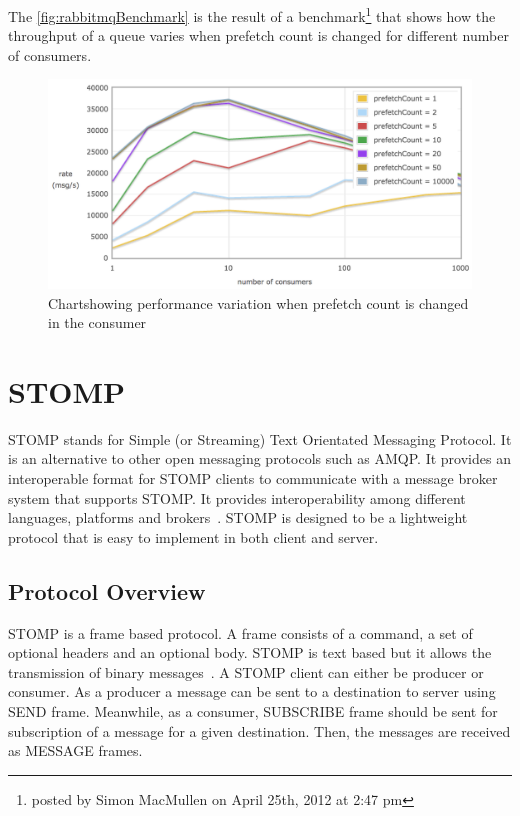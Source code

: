   The \autoref{fig:rabbitmqBenchmark} is the result of a benchmark\footnote{posted by Simon MacMullen on April 25th, 2012 at 2:47 pm} that shows how the throughput of a queue varies when prefetch count is changed for different number of consumers.
\begin{figure}[H]
  \centering
  \includegraphics[width=1\textwidth]{figures/rabbitmqPrefetch}
  \caption[Chart showing performance variation when prefetch count is changed in the consumer]{Chart\footnotemark showing performance variation when prefetch count is changed in the consumer}
  \label{fig:rabbitmqBenchmark}
\end{figure}

\section{STOMP}
\label{sec:stomp}
  STOMP stands for Simple (or Streaming) Text Orientated Messaging Protocol. It is an alternative to other open messaging protocols such as AMQP. It provides an interoperable format for STOMP clients to communicate with a message broker system that supports STOMP. It provides interoperability among different languages, platforms and brokers~\cite{stomp}.
  STOMP is designed to be a lightweight protocol that is easy to implement in both client and server.
  \subsection{Protocol Overview}
  STOMP is a frame based protocol. A frame consists of a command, a set of optional headers and an optional body. STOMP is text based but it allows the transmission of binary messages~\cite{stomp}.
  A STOMP client can either be producer or consumer. As a producer  a message can be sent to a destination to server using SEND frame. Meanwhile, as a consumer, SUBSCRIBE frame should be sent for subscription of a message for a given destination. Then, the messages are received as MESSAGE frames.

